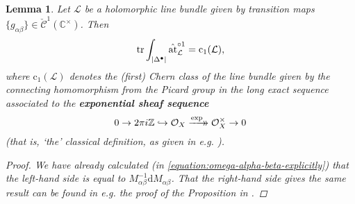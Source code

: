 \documentclass[11pt,fleqn]{article}
\theoremstyle{plain}
\newtheorem{lemma}[theorem]{Lemma}
\theoremstyle{definition}
\theoremstyle{remark}
\numberwithin{equation}{theorem}
\newcommand{\OO}{\mathcal{O}}
\newcommand{\at}{\mathrm{at}}
\newcommand{\simpexpat}[1]{\hat{\at}^{\circ#1}}
\newcommand{\define}[1]{\textbf{#1}}
\newcommand{\xtwoheadrightarrow}[2][]{%
  \xrightarrow[#1]{#2}\mathrel{\mkern-14mu}\rightarrow
}
\renewcommand{\d}{\mathrm{d}}
\begin{document}
        \begin{lemma}\label{lemma:agrees-for-line-bundles}
            Let $\mathcal{L}$ be a holomorphic line bundle given by transition maps $\{g_{\alpha\beta}\}\in\check{\mathcal{C}}^1(\mathbb{C}^\times)$.
            Then
            \begin{equation*}
                \tr\int_{|\Delta^\bullet|}\simpexpat{1}_\mathcal{L} = \mathrm{c}_1(\mathcal{L}),
            \end{equation*}
            where $\mathrm{c}_1(\mathcal{L})$ denotes the (first) Chern class of the line bundle given by the connecting homomorphism from the Picard group in the long exact sequence associated to the \define{exponential sheaf sequence}
            \begin{equation*}
                0
                \to
                2\pi i\mathbb{Z}
                \hookrightarrow
                \OO_X
                \xtwoheadrightarrow{\exp}
                \OO_X^\times
                \to
                0
            \end{equation*}
            (that is, `the' classical definition, as given in e.g. \cite[Definition~2.2.13]{Huybrechts2005}).
            \begin{proof}
                We have already calculated (in \cref{equation:omega-alpha-beta-explicitly}) that the left-hand side is equal to $M_{\alpha\beta}^{-1}\d M_{\alpha\beta}$.
                That the right-hand side gives the same result can be found in e.g. the proof of the Proposition in \cite[Chapter~1, §1, \emph{Chern Classes of Line Bundles}, p.~141]{Griffiths&Harris1994}.
            \end{proof}
        \end{lemma}
\end{document}
